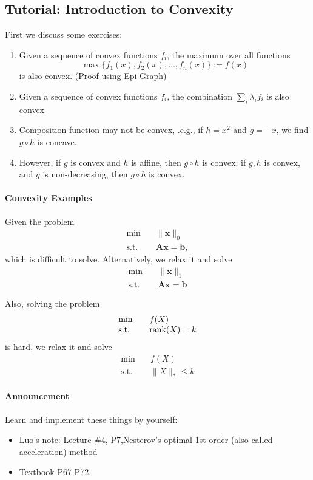 \subsection{Tutorial: Introduction to Convexity}
First we discuss some exercises:
\begin{enumerate}
\item
Given a sequence of convex functions $f_i$, the maximum over all functions
\[
\max\{f_1(x),f_2(x),\dots,f_n(x)\}:=f(x)
\]
is also convex. (Proof using Epi-Graph)
\item
Given a sequence of convex functions $f_i$, the combination $\sum_i\lambda_if_i$ is also convex
\item
Composition function may not be convex, .e.g., if $h=x^2$ and $g = -x$, we find $g\circ h$ is concave.
\item
However, if $g$ is convex and $h$ is affine, then $g\circ h$ is convex; if $g,h$ is convex, and $g$ is non-decreasing, then $g\circ h$ is convex.
\end{enumerate}
\paragraph{Convexity Examples}
Given the problem
\[
\begin{array}{ll}
\min&\quad \|\bm x\|_0\\
\mbox{s.t.}&\quad\bm{Ax}=\bm b,
\end{array}
\]
which is difficult to solve. Alternatively, we relax it and solve
\[
\begin{array}{ll}
\min&\quad \|\bm x\|_1\\
\mbox{s.t.}&\quad\bm{Ax}=\bm b
\end{array}
\]

Also, solving the problem
\[
\begin{array}{ll}
\min&\quad f(X)\\
\mbox{s.t.}&\quad\operatorname{rank}(X)=k
\end{array}
\]
is hard, we relax it and solve
\[
\begin{array}{ll}
\min&\quad f(X)\\
\mbox{s.t.}&\quad\|X\|_*\le k
\end{array}
\]
\paragraph{Announcement}
Learn and implement these things by yourself:
\begin{itemize}
\item
Luo's note: Lecture $\#4$, P7,Nesterov’s optimal 1st-order (also called acceleration) method
\item
Textbook P67-P72.
\end{itemize}
